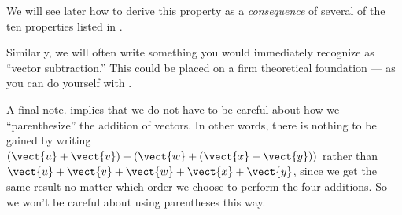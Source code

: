 %
We will see later how to derive this property as a {\em consequence} of several of the ten properties listed in .\par
%
Similarly, we will often write something you would immediately recognize as ``vector subtraction.''  This could be placed on a firm theoretical foundation --- as you can do yourself with .\par
%
A final note.   implies that we do not have to be careful about how we ``parenthesize'' the addition of vectors.  In other words, there is nothing to be gained by writing
$\left(\vect{u}+\vect{v}\right)+\left(\vect{w}+\left(\vect{x}+\vect{y}\right)\right)$
rather than
$\vect{u}+\vect{v}+\vect{w}+\vect{x}+\vect{y}$, since we get the same result no matter which order we choose to perform the four additions.  So we won't be careful about using parentheses this way.
%
%

